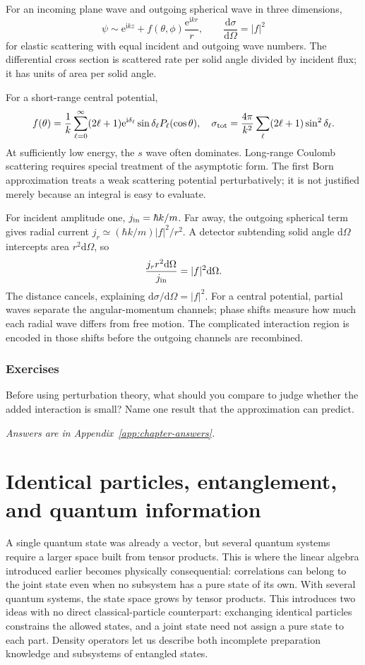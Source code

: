 \documentclass[11pt,oneside]{book}
\newcommand{\dd}{\mathrm{d}}
\newcommand{\ii}{\mathrm{i}}
\newcommand{\ee}{\mathrm{e}}
\newcommand{\od}[2]{\frac{\dd #1}{\dd #2}}
\theoremstyle{reviewstyle}
\newcommand{\learningcheck}[1]{\subsection*{Exercises}\noindent #1\par\smallskip\noindent\emph{Answers are in Appendix~\ref{app:chapter-answers}.}}
\begin{document}
For an incoming plane wave and outgoing spherical wave in three dimensions,
\begin{equation}\psi\sim\ee^{\ii kz}+f(\theta,\phi)\frac{\ee^{\ii kr}}r,\qquad \od{\sigma}{\Omega}=|f|^2\end{equation}
for elastic scattering with equal incident and outgoing wave numbers. The differential cross section is scattered rate per solid angle divided by incident flux; it has units of area per solid angle.

For a short-range central potential,
\begin{equation}f(\theta)=\frac1k\sum_{\ell=0}^\infty(2\ell+1)\ee^{\ii\delta_\ell}\sin\delta_\ell P_\ell(\cos\theta),\quad
\sigma_{\rm tot}=\frac{4\pi}{k^2}\sum_\ell(2\ell+1)\sin^2\delta_\ell.
\end{equation}
At sufficiently low energy, the $s$ wave often dominates. Long-range Coulomb scattering requires special treatment of the asymptotic form. The first Born approximation treats a weak scattering potential perturbatively; it is not justified merely because an integral is easy to evaluate.

For incident amplitude one, $j_{\rm in}=\hbar k/m$. Far away, the outgoing spherical term gives radial current $j_r\simeq(\hbar k/m)|f|^2/r^2$. A detector subtending solid angle $\dd\Omega$ intercepts area $r^2\dd\Omega$, so
\begin{equation}
\frac{j_r r^2\dd\Omega}{j_{\rm in}}=|f|^2\dd\Omega.
\end{equation}
The distance cancels, explaining $\dd\sigma/\dd\Omega=|f|^2$. For a central potential, partial waves separate the angular-momentum channels; phase shifts measure how much each radial wave differs from free motion. The complicated interaction region is encoded in those shifts before the outgoing channels are recombined.

\learningcheck{Before using perturbation theory, what should you compare to judge whether the added interaction is small? Name one result that the approximation can predict.}

\chapter{Identical particles, entanglement, and quantum information}
A single quantum state was already a vector, but several quantum systems require a larger space built from tensor products. This is where the linear algebra introduced earlier becomes physically consequential: correlations can belong to the joint state even when no subsystem has a pure state of its own.
With several quantum systems, the state space grows by tensor products. This introduces two ideas with no direct classical-particle counterpart: exchanging identical particles constrains the allowed states, and a joint state need not assign a pure state to each part. Density operators let us describe both incomplete preparation knowledge and subsystems of entangled states.
\end{document}
